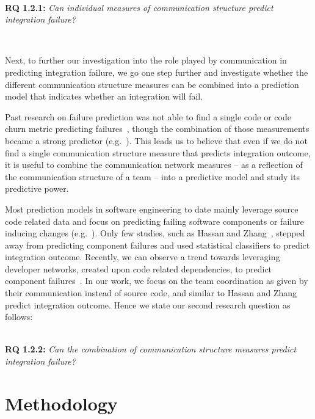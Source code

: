 \ \

\noindent\textbf{RQ 1.2.1:} \emph{Can individual measures of communication structure
predict integration failure?}

\ \

Next, to further our investigation into the role played by communication in
predicting integration failure, we go one step further and investigate whether
the different communication structure measures can be combined into a prediction
model that indicates whether an integration will fail.

Past research on failure prediction was not able to find a single code or code
churn metric predicting
failures~\cite{nagappan:icse:2006,basili:1996tse,denaro:2002seke}, though the
combination of those measurements became a strong predictor
(e.g.~\cite{mockus:2000bell}). This leads us to believe that even if we do not
find a single communication structure measure that predicts integration outcome,
it is useful to combine the communication network measures -- as a reflection of
the communication structure of a team -- into a predictive model and study its
predictive power.

Most prediction models in software engineering to date mainly leverage source
code related data and focus on predicting failing software components or failure
inducing changes
(e.g.~\cite{bell:2005tse,schroeter:isese:2006,zimmermann:icse:2008,kim:2008tse}).
Only few studies, such as Hassan and Zhang~\cite{hassan:ase:2006}, stepped away
from predicting component failures and used statistical classifiers to predict
integration outcome. Recently, we can observe a trend towards leveraging
developer networks, created upon code related dependencies, to predict component
failures~\cite{pinzger:fse:2008,meneely:fse:2008}. In our work, we focus on the
team coordination as given by their communication instead of source code, and
similar to Hassan and Zhang predict integration outcome. Hence we state our
second research question as follows:

\ \\

\noindent\textbf{RQ 1.2.2:} \emph{Can the combination of communication structure
measures predict integration failure?}



\section{Methodology}
\label{sec:Methodology}

